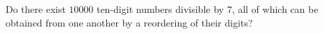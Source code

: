 Do there exist $10000$ ten-digit numbers divisible by $7$, all of which can be obtained from one another by a reordering of their digits?